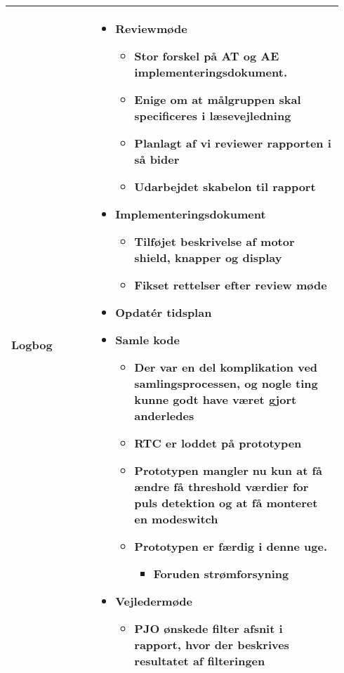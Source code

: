 \begin{longtable}{|p{0.24\linewidth}|p{0.7\linewidth}|}
		\\ \hline
		Logbog & 
		\begin{itemize}
			\item Reviewmøde 
			\begin{itemize}
				\item Stor forskel på AT og AE implementeringsdokument.
				\item Enige om at målgruppen skal specificeres i læsevejledning
				\item Planlagt af vi reviewer rapporten i så bider
				\item Udarbejdet skabelon til rapport 
			\end{itemize}
			\item Implementeringsdokument
			\begin{itemize}
				\item Tilføjet beskrivelse af motor shield, knapper og display
				\item Fikset rettelser efter review møde
			\end{itemize}
			\item Opdatér tidsplan
			\item Samle kode 
			\begin{itemize}
				\item Der var en del komplikation ved samlingsprocessen, og nogle ting kunne godt have været gjort anderledes
				\item RTC er loddet på prototypen
				\item Prototypen mangler nu kun at få ændre få threshold værdier for puls detektion og at få monteret en modeswitch
				\item Prototypen er færdig i denne uge. 
				\begin{itemize}
					\item Foruden strømforsyning
				\end{itemize}
			\end{itemize}
			\item Vejledermøde
			\begin{itemize}
				\item PJO ønskede filter afsnit i rapport, hvor der beskrives resultatet af filteringen
			\end{itemize}
		\end{itemize}
		\\ \hline
	\end{longtable}
	
